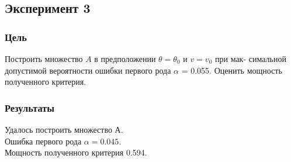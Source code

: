 \documentclass[a4paper, 12pt]{article}
\begin{document}
\subsection{Эксперимент 3}
\subsubsection{Цель}
Построить множество $A$ в предположении $\theta = \theta_0$ и $v = v_0$ при мак-
симальной допустимой вероятности ошибки первого рода $\alpha$ = 0.055.
Оценить мощность полученного критерия.
\subsubsection{Результаты}

Удалось построить множество А.\\
Ошибка первого рода $\alpha = 0.045.$\\
Мощность полученного критерия 0.594.\\
\end{document}
